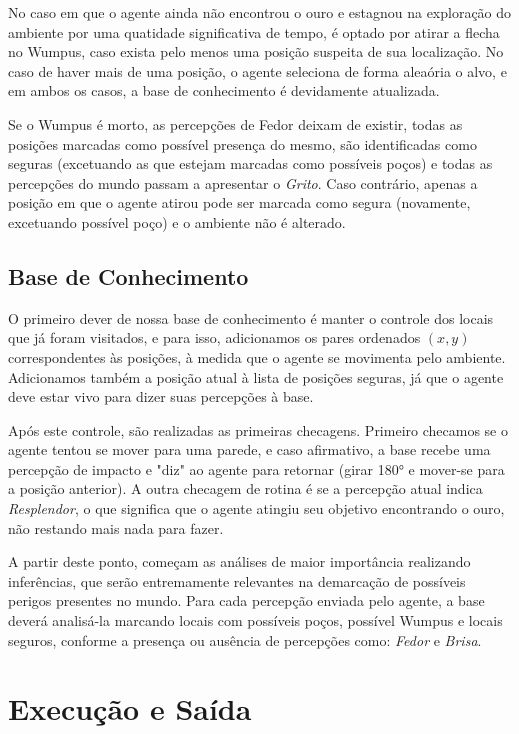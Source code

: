 \documentclass[a4paper, 12pt]{article}
\begin{document}
No caso em que o agente ainda não encontrou o ouro e estagnou na exploração do ambiente por uma quatidade significativa de tempo, é optado por atirar a flecha no Wumpus, caso exista pelo menos uma posição suspeita de sua localização. No caso de haver mais de uma posição, o agente seleciona de forma aleaória o alvo, e em ambos os casos, a base de conhecimento é devidamente atualizada.

Se o Wumpus é morto, as percepções de Fedor deixam de existir, todas as posições marcadas como possível presença do mesmo, são identificadas como seguras (excetuando as que estejam marcadas como possíveis poços) e todas as percepções do mundo passam a apresentar o \emph{Grito}. Caso contrário, apenas a posição em que o agente atirou pode ser marcada como segura (novamente, excetuando possível poço) e o ambiente não é alterado.

\subsection{Base de Conhecimento}

O primeiro dever de nossa base de conhecimento é manter o controle dos locais que já foram visitados, e para isso, adicionamos os pares ordenados \((x, y)\) correspondentes às posições, à medida que o agente se movimenta pelo ambiente. Adicionamos também a posição atual à lista de posições seguras, já que o agente deve estar vivo para dizer suas percepções à base.

Após este controle, são realizadas as primeiras checagens. Primeiro checamos se o agente tentou se mover para uma parede, e caso afirmativo, a base recebe uma percepção de impacto e "diz" ao agente para retornar (girar 180° e mover-se para a posição anterior). A outra checagem de rotina é se a percepção atual indica \emph{Resplendor}, o que significa que o agente atingiu seu objetivo encontrando o ouro, não restando mais nada para fazer.

A partir deste ponto, começam as análises de maior importância realizando inferências, que serão entremamente relevantes na demarcação de possíveis perigos presentes no mundo. Para cada percepção enviada pelo agente, a base deverá analisá-la marcando locais com possíveis poços, possível Wumpus e locais seguros, conforme a presença ou ausência de percepções como: \emph{Fedor} e \emph{Brisa}.

\section{Execução e Saída}
\end{document}

